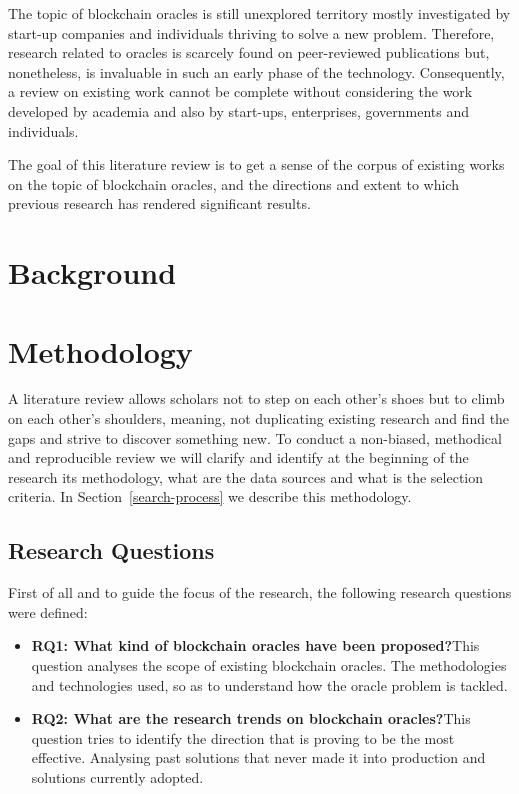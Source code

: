 \documentclass[final,3p,12pt,twocolumn]{elsarticle}
\begin{document}
The topic of blockchain oracles is still unexplored territory mostly investigated by start-up companies and individuals thriving to solve a new problem. Therefore, research related to oracles is scarcely found on peer-reviewed publications but, nonetheless, is invaluable in such an early phase of the technology. Consequently, a review on existing work cannot be complete without considering the work developed by academia and also by start-ups, enterprises, governments and individuals.



The goal of this literature review is to get a sense of the corpus of existing works on the topic of blockchain oracles, and the directions and extent to which previous research has rendered significant results.

\section{Background}


\section{Methodology}
A literature review allows scholars not to step on each other's shoes but to climb on each other's shoulders, meaning, not duplicating existing research and find the gaps and strive to discover something new. To conduct a non-biased, methodical and reproducible review we will clarify and identify at the beginning of the research its methodology, what are the data sources and what is the selection criteria. In Section~\ref{search-process} we describe this methodology.

\subsection{Research Questions}
First of all and to guide the focus of the research, the following research questions were defined:
\begin{itemize}
  \item \textbf{RQ1:\label{RQ1} What kind of blockchain oracles have been proposed?}\newline This question analyses the scope of existing blockchain oracles. The methodologies and technologies used, so as to understand how the oracle problem is tackled.
  \item \textbf{RQ2:\label{RQ2} What are the research trends on blockchain oracles?}\newline This question tries to identify the direction that is proving to be the most effective. Analysing past solutions that never made it into production and solutions currently adopted.
\end{itemize}
\end{document}
